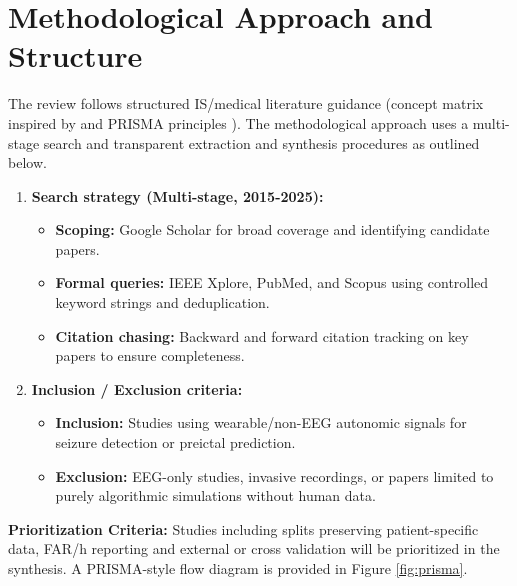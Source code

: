 \section{Methodological Approach and Structure}
The review follows structured IS/medical literature guidance (concept
matrix inspired by \parencite{websterAnalyzingPrepareFuture2002} and PRISMA
principles \parencite{tugwellPRISMA20202021}). The methodological approach uses a multi-stage search and
transparent extraction and synthesis procedures as outlined below.

\begin{enumerate}
  \item \textbf{Search strategy (Multi-stage, 2015-2025):}
    \begin{itemize}
      \item \textbf{Scoping:} Google Scholar for broad coverage and
        identifying candidate papers.
      \item \textbf{Formal queries:} IEEE Xplore, PubMed, and Scopus
        using controlled keyword strings and deduplication.
      \item \textbf{Citation chasing:} Backward and forward citation
        tracking on key papers to ensure completeness.
    \end{itemize}
  \item \textbf{Inclusion / Exclusion criteria:}
    \begin{itemize}
      \item \textbf{Inclusion:} Studies using wearable/non-EEG autonomic
        signals for seizure detection or preictal prediction.
      \item \textbf{Exclusion:} EEG-only studies, invasive recordings,
        or papers limited to purely algorithmic simulations without
        human data.
    \end{itemize}
\end{enumerate}


\noindent\textbf{Prioritization Criteria:}
Studies including splits preserving patient-specific data, FAR/h reporting
and external or cross validation will be prioritized in the synthesis. A PRISMA-style flow diagram
is provided in Figure \ref{fig:prisma}.


